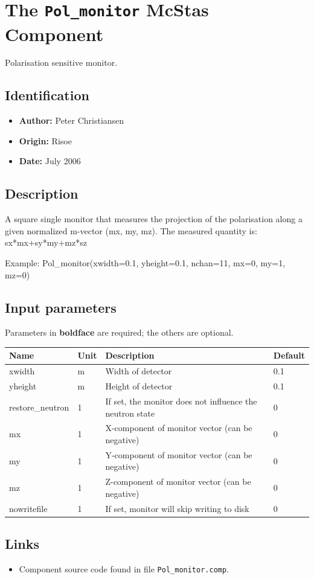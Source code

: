 \section{The \texttt{Pol\_monitor} McStas Component}
Polarisation sensitive monitor.

\subsection*{Identification}
\begin{itemize}
  \item \textbf{Author:} Peter Christiansen
  \item \textbf{Origin:} Risoe
  \item \textbf{Date:} July 2006
\end{itemize}

\subsection*{Description}
A square single monitor that measures the projection of the polarisation along a given normalized m-vector (mx, my, mz). The measured quantity is: sx*mx+sy*my+mz*sz

Example: Pol\_monitor(xwidth=0.1, yheight=0.1, nchan=11, mx=0, my=1, mz=0)

\subsection*{Input parameters}
Parameters in \textbf{boldface} are required; the others are optional.

\begin{longtable}{p{}p{}p{}p{}}
\toprule
\textbf{Name} & \textbf{Unit} & \textbf{Description} & \textbf{Default} \\
\midrule
\endhead
xwidth & m & Width of detector & 0.1 \\
yheight & m & Height of detector & 0.1 \\
restore\_neutron & 1 & If set, the monitor does not influence the neutron state & 0 \\
mx & 1 & X-component of monitor vector (can be negative) & 0 \\
my & 1 & Y-component of monitor vector (can be negative) & 0 \\
mz & 1 & Z-component of monitor vector (can be negative) & 0 \\
nowritefile & 1 & If set, monitor will skip writing to disk & 0 \\
\bottomrule
\end{longtable}

\subsection*{Links}
\begin{itemize}
  \item Component source code found in file \texttt{Pol\_monitor.comp}.
\end{itemize}
